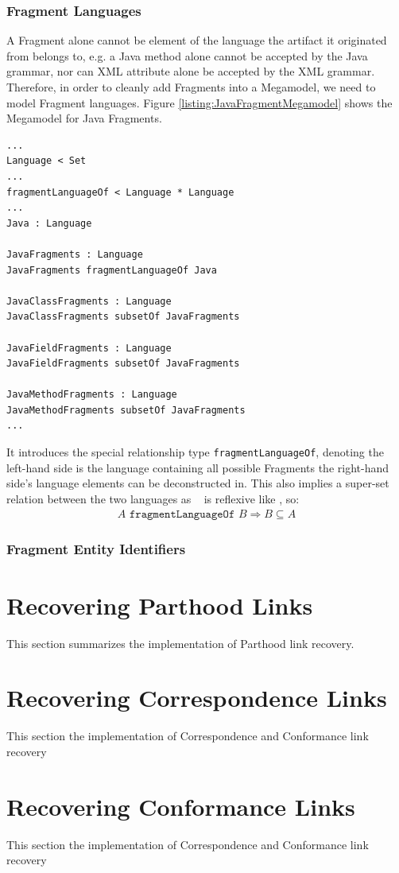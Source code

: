 \subsubsection{Fragment Languages}
\label{subsubsection:FragmentLanguages}
A \gls{Fragment} alone cannot be element of the language the artifact it originated from belongs to, e.g. a \gls{Java} method alone cannot be accepted by the \gls{Java} grammar, nor can \gls{XML} attribute alone be accepted by the \gls{XML} grammar.
Therefore, in order to cleanly add \glspl{Fragment} into a \gls{Megamodel}, we need to model \gls{Fragment} languages.
Figure \ref{listing:JavaFragmentMegamodel} shows the \gls{Megamodel} for \gls{Java} \glspl{Fragment}.
\begin{lstlisting}[caption={A Megamodel for Java Fragment},label={listing:JavaFragmentMegamodel}]
...
Language < Set
...
fragmentLanguageOf < Language * Language
...
Java : Language

JavaFragments : Language
JavaFragments fragmentLanguageOf Java

JavaClassFragments : Language
JavaClassFragments subsetOf JavaFragments

JavaFieldFragments : Language
JavaFieldFragments subsetOf JavaFragments

JavaMethodFragments : Language
JavaMethodFragments subsetOf JavaFragments
...
\end{lstlisting}
It introduces the special relationship type \texttt{fragmentLanguageOf}, denoting the left-hand side is the language containing all possible \glspl{Fragment}  the right-hand side's language elements can be deconstructed in.
This also implies a super-set relation between the two languages as \fragmentOf~ is reflexive like \partOf, so:
\begin{align*}
A \texttt{~fragmentLanguageOf~} B \Rightarrow B \subseteq A
\end{align*}

\subsubsection{Fragment Entity Identifiers}
\label{subsubsection:FragmentEntityIdentifiers}

\section{Recovering Parthood Links}
\label{section:RecoveringParthoodLinks}
This section summarizes the implementation of \gls{Parthood} link recovery.



\section{Recovering Correspondence  Links}
\label{section:RecoveringCorrespondenceLinks}
This section the implementation of \gls{Correspondence} and \gls{Conformance} link recovery

\section{Recovering Conformance Links}
\label{section:RecoveringConformanceLinks}
This section the implementation of \gls{Correspondence} and \gls{Conformance} link recovery